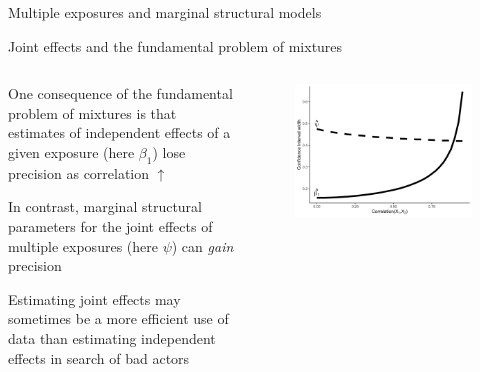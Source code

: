 \begin{frame}[t]{Multiple exposures and marginal structural models}
\end{frame}

\begin{frame}[t]{Joint effects and the fundamental problem of mixtures}
  \begin{columns}
    \begin{column}[c]{.5\textwidth}
    One consequence of the fundamental problem of mixtures is that estimates of independent effects of a given exposure (here $\beta_1$) lose precision as correlation $\uparrow$
    \bigskip
    
    In contrast, marginal structural parameters for the joint effects of multiple exposures (here $\psi$) can \emph{gain} precision\footnotemark
     \bigskip
    
   Estimating joint effects may sometimes be a more efficient use of data than estimating independent effects in search of bad actors 
    \end{column}
    \begin{column}[c]{.5\textwidth}
    \begin{figure}\includegraphics[width=\textwidth]{img/afig1_rev1.png}\end{figure}
    \end{column}
  \end{columns}



\end{frame}


